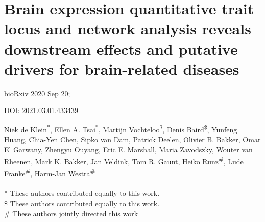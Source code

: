 \chapterfont{\huge\color{DarkOrange}}  %
\sectionfont{\color{DarkOrange}}  %
\subsectionfont{\color{DarkOrange}}  %

\renewcommand\pcolor{DarkOrange}
\renewcommand{\headrule}{\hbox to\headwidth{%
		\color{DarkOrange}\leaders\hrule height \headrulewidth\hfill}} %
\fancyfoot[LE,RO]{\thepage}



\cleardoublepage
\makeatletter
\let\savedchap\@makechapterhead
\def\@makechapterhead{\vspace*{-3cm}\savedchap}
\chapter[Brain expression quantitative trait locus and network analysis reveals downstream effects and putative drivers for brain-related diseases ]{Brain expression quantitative trait locus and network analysis reveals downstream effects and putative drivers for brain-related diseases}

\chaptermark{}
\let\@makechapterhead\savedchap
\makeatletter
\label{chap:chapter5-brain}

\hfill \underline{bioRxiv} 2020 Sep 20;

\hfill DOI: \href{https://doi.org/10.1101/2021.03.01.433439 }{2021.03.01.433439}


Niek de Klein\textsuperscript{*}, Ellen A. Tsai\textsuperscript{*}, Martijn Vochteloo\textsuperscript{\$}, Denis Baird\textsuperscript{\$}, Yunfeng Huang, Chia-Yen Chen, Sipko van Dam, Patrick Deelen, Olivier B. Bakker, Omar El Garwany, Zhengyu Ouyang, Eric E. Marshall, Maria Zavodszky, Wouter van Rheenen, Mark K. Bakker, Jan Veldink, Tom R. Gaunt, Heiko Runz\textsuperscript{\#}, Lude Franke\textsuperscript{\#}, Harm-Jan Westra\textsuperscript{\#}
\\
\\
* These authors contributed equally to this work. \\
\$ These authors contributed equally to this work. \\
\# These authors jointly directed this work

\newpage

